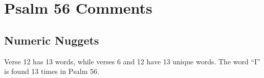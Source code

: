 \section{Psalm 56 Comments}

\subsection{Numeric Nuggets}
Verse 12 has 13 words, while verses 6 and 12 have 13 unique words. The word ``I'' is found 13 times in Psalm 56.



